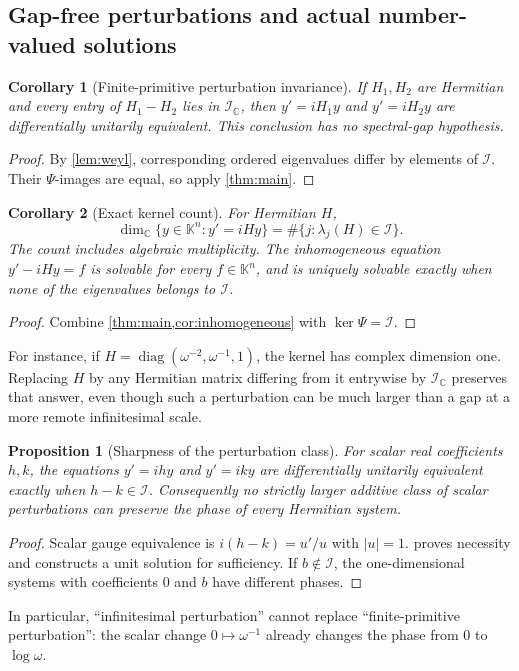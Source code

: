 \documentclass[11pt,a4paper]{article}
\numberwithin{equation}{section}
\newtheorem{proposition}[proposition]{Proposition}
\newtheorem{corollary}[corollary]{Corollary}
\theoremstyle{definition}
\theoremstyle{remark}
\newcommand{\K}{\mathbb K}
\newcommand{\C}{\mathbb C}
\newcommand{\II}{\mathcal I}
\newcommand{\diag}{\operatorname{diag}}
\begin{document}
\subsection{Gap-free perturbations and actual number-valued solutions}
\begin{corollary}[Finite-primitive perturbation invariance]\label{cor:perturbation}
If $H_1,H_2$ are Hermitian and every entry of $H_1-H_2$ lies in
$\II_{\C}$, then $y'=iH_1y$ and $y'=iH_2y$ are differentially unitarily
equivalent. This conclusion has no spectral-gap hypothesis.
\end{corollary}
\begin{proof}
By \cref{lem:weyl}, corresponding ordered eigenvalues differ by elements
of $\II$. Their $\Psi$-images are equal, so apply \cref{thm:main}.
\end{proof}

\begin{corollary}[Exact kernel count]\label{cor:kernel}
For Hermitian $H$,
\begin{equation}\label{eq:kernel-count}
 \dim_{\C}\{y\in\K^n:y'=iHy\}
   =\#\{j:\lambda_j(H)\in\II\}.
\end{equation}
The count includes algebraic multiplicity. The inhomogeneous equation
$y'-iHy=f$ is solvable for every $f\in\K^n$, and is uniquely solvable
exactly when none of the eigenvalues belongs to $\II$.
\end{corollary}
\begin{proof}
Combine \cref{thm:main,cor:inhomogeneous} with $\ker\Psi=\II$.
\end{proof}

For instance, if $H=\diag(\omega^{-2},\omega^{-1},1)$, the kernel has
complex dimension one. Replacing $H$ by any Hermitian matrix differing
from it entrywise by $\II_{\C}$ preserves that answer, even though such a
perturbation can be much larger than a gap at a more remote infinitesimal
scale.

\begin{proposition}[Sharpness of the perturbation class]\label{prop:sharp}
For scalar real coefficients $h,k$, the equations $y'=ihy$ and $y'=iky$
are differentially unitarily equivalent exactly when $h-k\in\II$.
Consequently no strictly larger additive class of scalar perturbations can
preserve the phase of every Hermitian system.
\end{proposition}
\begin{proof}
Scalar gauge equivalence is $i(h-k)=u'/u$ with $|u|=1$.
 proves necessity and constructs a unit solution for
sufficiency. If $b\notin\II$, the one-dimensional systems with
coefficients $0$ and $b$ have different phases.
\end{proof}
In particular, ``infinitesimal perturbation'' cannot replace
``finite-primitive perturbation'': the scalar change $0\mapsto\omega^{-1}$
already changes the phase from $0$ to $\log\omega$.
\end{document}
